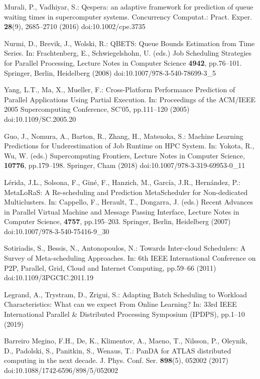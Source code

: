 Murali, P., Vadhiyar, S.: Qespera: an adaptive framework for prediction of queue waiting times in supercomputer systems. Concurrency Computat.: Pract. Exper. \textbf{28}(9), 2685--2710 (2016) doi:10.1002/cpe.3735

Nurmi, D., Brevik, J., Wolski, R.: QBETS: Queue Bounds Estimation from Time Series. In: Frachtenberg, E., Schwiegelshohn, U. (eds.) Job Scheduling Strategies for Parallel Processing, Lecture Notes in Computer Science \textbf{4942}, pp.76--101. Springer, Berlin, Heidelberg (2008) doi:10.1007/978-3-540-78699-3\_5

Yang, L.T., Ma, X., Mueller, F.: Cross-Platform Performance Prediction of Parallel Applications Using Partial Execution. In: Proceedings of the ACM/IEEE 2005 Supercomputing Conference, SC'05, pp.111--120 (2005) doi:10.1109/SC.2005.20

Guo, J., Nomura, A., Barton, R., Zhang, H., Matsuoka, S.: Machine Learning Predictions for Underestimation of Job Runtime on HPC System. In: Yokota, R., Wu, W. (eds.) Supercomputing Frontiers, Lecture Notes in Computer Science, \textbf{10776}, pp.179--198. Springer, Cham (2018) doi:10.1007/978-3-319-69953-0\_11

Lérida, J.L., Solsona, F., Giné, F., Hanzich, M., García, J.R., Hernández, P.: MetaLoRaS: A Re-scheduling and Prediction MetaScheduler for Non-dedicated Multiclusters. In: Cappello, F., Herault, T., Dongarra, J. (eds.) Recent Advances in Parallel Virtual Machine and Message Passing Interface, Lecture Notes in Computer Science, \textbf{4757}, pp.195--203. Springer, Berlin, Heidelberg (2007) doi:10.1007/978-3-540-75416-9\_30

Sotiriadis, S., Bessis, N., Antonopoulos, N.: Towards Inter-cloud Schedulers: A Survey of Meta-scheduling Approaches. In: 6th IEEE International Conference on P2P, Parallel, Grid, Cloud and Internet Computing, pp.59--66 (2011) doi:10.1109/3PGCIC.2011.19

Legrand, A., Trystram, D., Zrigui, S.: Adapting Batch Scheduling to Workload Characteristics: What can we expect From Online Learning? In: 33rd IEEE International Parallel \& Distributed Processing Symposium (IPDPS), pp.1--10 (2019)

Barreiro Megino, F.H., De, K., Klimentov, A., Maeno, T., Nilsson, P., Oleynik, D., Padolski, S., Panitkin, S., Wenaus, T.: PanDA for ATLAS distributed computing in the next decade. J. Phys. Conf. Ser. \textbf{898}(5), 052002 (2017) doi:10.1088/1742-6596/898/5/052002

